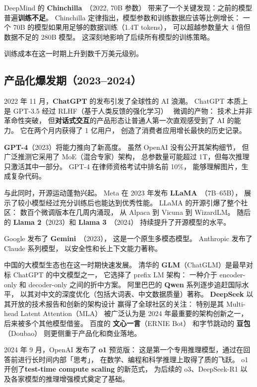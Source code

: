 DeepMind 的 \textbf{Chinchilla}~\cite{hoffmann2022chinchilla}（2022, 70B 参数）
带来了一个关键发现：之前的模型普遍\textbf{训练不足}。
Chinchilla 定律指出，模型参数和训练数据应该等比例增长：
一个 70B 的模型如果用足够的数据训练（1.4T tokens），
可以超越参数量大 4 倍但数据不足的 280B 模型。
这深刻地影响了后续所有模型的训练策略。

训练成本在这一时期上升到数千万美元级别。

\subsection{产品化爆发期（2023--2024）}

2022 年 11 月，\textbf{ChatGPT} 的发布引发了全球性的 AI 浪潮。
ChatGPT 本质上是 GPT-3.5 经过 RLHF（基于人类反馈的强化学习）
~\cite{ouyang2022rlhf}微调的产物：
技术上并非革命性突破，
但\textbf{对话式交互}的产品形态让普通人第一次直观感受到了 AI 的能力。
它在两个月内获得了 1 亿用户，
创造了消费者应用增长最快的历史记录。

\textbf{GPT-4}（2023）将能力推向了新高度。
虽然 OpenAI 没有公开其架构细节，
但广泛推测它采用了 MoE（混合专家）架构，
总参数量可能超过 1T，但每次推理只激活其中一部分。
GPT-4 在律师资格考试中排名前 10\%，
能够理解图片，生成复杂代码。

与此同时，开源运动蓬勃兴起。
Meta 在 2023 年发布 \textbf{LLaMA}~\cite{touvron2023llama}（7B--65B），
展示了较小模型经过充分训练后也能达到优秀性能。
LLaMA 的开源引爆了整个社区：
数百个微调版本在几周内涌现，
从 Alpaca 到 Vicuna 到 WizardLM。
随后的 \textbf{Llama 2}（2023）和 \textbf{Llama 3}~\cite{dubey2024llama3}（2024）
持续提升了开源模型的水平。

Google 发布了 \textbf{Gemini}~\cite{anil2023gemini}（2023），
这是一个原生多模态模型。
Anthropic 发布了 Claude 系列模型，
以安全性和长上下文能力著称。

中国的大模型生态也在这一时期快速发展。
清华的 \textbf{GLM}（ChatGLM）是最早对标 ChatGPT 的中文模型之一，
它选择了 prefix LM 架构：
一种介于 encoder-only 和 decoder-only 之间的折中方案。
阿里巴巴的 \textbf{Qwen} 系列逐步追赶国际水平，
以其对中文的深度优化（包括大词表、中文数据质量）著称。
\textbf{DeepSeek} 以其开放的技术报告和创新的架构设计
赢得了全球社区的关注：
特别是其 Multi-head Latent Attention（MLA）
被广泛认为是 2024 年最重要的架构创新之一，
后来被多个其他模型借鉴。
百度的 \textbf{文心一言}（ERNIE Bot）
和字节跳动的 \textbf{豆包}（Doubao）
则更侧重于产品化和商业落地。

2024 年 9 月，OpenAI 发布了 \textbf{o1} 预览版：
这是第一个专用推理模型，通过在回答前进行长时间内部「思考」，
在数学、编程和科学推理上取得了质的飞跃。
o1 开创了\textbf{test-time compute scaling} 的新范式，
为后续的 o3、DeepSeek-R1 以及各家模型的推理增强模式奠定了基础。

